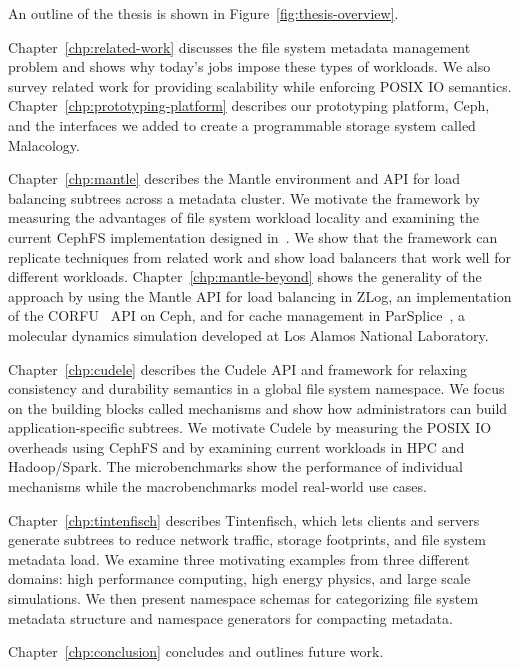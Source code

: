 An outline of the thesis is shown in Figure~\ref{fig:thesis-overview}.

Chapter~\ref{chp:related-work} discusses the file system metadata management
problem and shows why today's jobs impose these types of workloads. We also
survey related work for providing scalability while enforcing POSIX IO
semantics. Chapter~\ref{chp:prototyping-platform} describes our prototyping
platform, Ceph, and the interfaces we added to create a programmable storage
system called Malacology.

Chapter~\ref{chp:mantle} describes the Mantle environment and API for load
balancing subtrees across a metadata cluster. We motivate the framework by
measuring the advantages of file system workload locality and examining the
current CephFS implementation designed in~\cite{weil:osdi2006-ceph,
weil:sc2004-dyn-metadata}. We show that the framework can replicate techniques
from related work and show load balancers that work well for different
workloads. Chapter~\ref{chp:mantle-beyond} shows the generality of the approach
by using the Mantle API for load balancing in ZLog, an implementation of the
CORFU~\cite{balakrishnan_corfu_2012} API on Ceph, and for cache management in
ParSplice~\cite{perez:jctc20150parsplice}, a molecular dynamics simulation
developed at Los Alamos National Laboratory.

Chapter~\ref{chp:cudele} describes the Cudele API and framework for relaxing
consistency and durability semantics in a global file system namespace. We
focus on the building blocks called mechanisms and show how administrators can
build application-specific subtrees.  We motivate Cudele by measuring the POSIX
IO overheads using CephFS and by examining current workloads in HPC and
Hadoop/Spark. The microbenchmarks show the performance of individual mechanisms
while the macrobenchmarks model real-world use cases.

Chapter~\ref{chp:tintenfisch} describes Tintenfisch, which lets clients and
servers generate subtrees to reduce network traffic, storage footprints, and
file system metadata load. We examine three motivating examples from three
different domains: high performance computing, high energy physics, and large
scale simulations. We then present namespace schemas for categorizing file
system metadata structure and namespace generators for compacting metadata.

Chapter~\ref{chp:conclusion} concludes and outlines future work.

